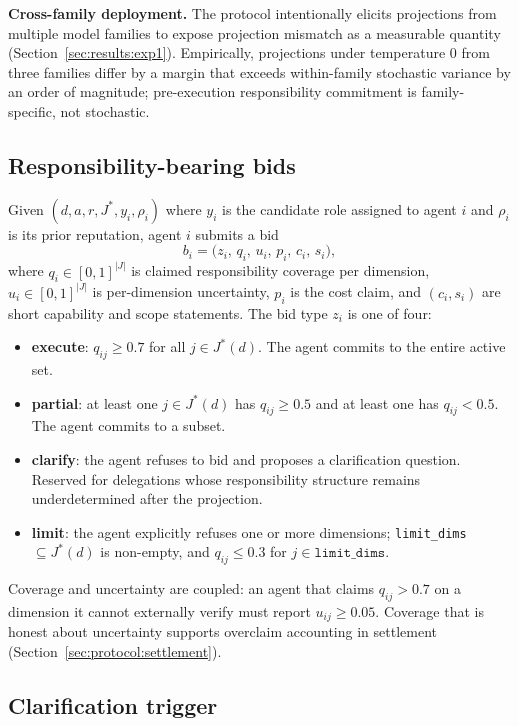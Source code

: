 \textbf{Cross-family deployment.} The protocol intentionally elicits projections from multiple model families to expose projection mismatch as a measurable quantity (Section~\ref{sec:results:exp1}). Empirically, projections under temperature 0 from three families differ by a margin that exceeds within-family stochastic variance by an order of magnitude; pre-execution responsibility commitment is family-specific, not stochastic.

\subsection{Responsibility-bearing bids}
\label{sec:protocol:bid}

Given $(d, a, r, J^*, y_i, \rho_i)$ where $y_i$ is the candidate role assigned to agent $i$ and $\rho_i$ is its prior reputation, agent $i$ submits a bid
\begin{equation}
b_i = \bigl( z_i,\, q_i,\, u_i,\, p_i,\, c_i,\, s_i \bigr),
\label{eq:bid}
\end{equation}
where $q_i \in [0,1]^{|J|}$ is claimed responsibility coverage per dimension, $u_i \in [0,1]^{|J|}$ is per-dimension uncertainty, $p_i$ is the cost claim, and $(c_i, s_i)$ are short capability and scope statements. The bid type $z_i$ is one of four:
\begin{itemize}
    \item \textbf{execute}: $q_{ij} \geq 0.7$ for all $j \in J^*(d)$. The agent commits to the entire active set.
    \item \textbf{partial}: at least one $j \in J^*(d)$ has $q_{ij} \geq 0.5$ and at least one has $q_{ij} < 0.5$. The agent commits to a subset.
    \item \textbf{clarify}: the agent refuses to bid and proposes a clarification question. Reserved for delegations whose responsibility structure remains underdetermined after the projection.
    \item \textbf{limit}: the agent explicitly refuses one or more dimensions; \texttt{limit\_dims} $\subseteq J^*(d)$ is non-empty, and $q_{ij} \leq 0.3$ for $j \in \texttt{limit\_dims}$.
\end{itemize}
Coverage and uncertainty are coupled: an agent that claims $q_{ij} > 0.7$ on a dimension it cannot externally verify must report $u_{ij} \geq 0.05$. Coverage that is honest about uncertainty supports overclaim accounting in settlement (Section~\ref{sec:protocol:settlement}).

\subsection{Clarification trigger}
\label{sec:protocol:clarify}

